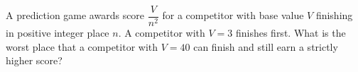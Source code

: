 A prediction game awards score $\dfrac{V}{n^2}$ for a competitor with base value $ V $ finishing in positive integer place $ n $. A competitor with $ V=3 $ finishes first. What is the worst place that a competitor with $ V=40 $ can finish and still earn a strictly higher score?
